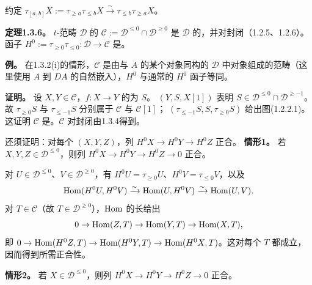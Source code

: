 约定 $\tau_{[a,b]}X:=\tau_{\geq a}\tau_{\leq b}X\xrightarrow{\sim}\tau_{\leq b}\tau_{\geq a}X$。

\par\medskip\noindent\textbf{定理1.3.6。} $t$-范畴 $\mathcal D$ 的 $\mathcal C:=\mathcal D^{\leq0}\cap\mathcal D^{\geq0}$ 是 $\mathcal D$ 的，并对封闭（1.2.5、1.2.6）。函子 $H^0:=\tau_{\geq0}\tau_{\leq0}:\mathcal D\to\mathcal C$ 是。

\par\medskip\noindent\textbf{例。} 在1.3.2(i)的情形，$\mathcal C$ 是由与 $A$ 的某个对象同构的 $\mathcal D$ 中对象组成的范畴（这里使用 $A$ 到 $DA$ 的自然嵌入），$H^0$ 与通常的 $H^0$ 函子等同。

\par\medskip\noindent\textbf{证明。} 设 $X,Y\in\mathcal C$，$f:X\to Y$ 的为 $S$。 $(Y,S,X[1])$ 表明 $S\in\mathcal D^{\leq0}\cap\mathcal D^{\geq-1}$。故 $\tau_{\geq0}S$ 与 $\tau_{\leq-1}S$ 分别属于 $\mathcal C$ 与 $\mathcal C[1]$； $(\tau_{\leq-1}S,S,\tau_{\geq0}S)$ 给出图(1.2.2.1)。这证明 $\mathcal C$ 是。$\mathcal C$ 对封闭由1.3.4得到。

还须证明：对每个 $(X,Y,Z)$，列 $H^0X\to H^0Y\to H^0Z$ 正合。
\noindent\textbf{情形1。} 若 $X,Y,Z\in\mathcal D^{\leq0}$，则列 $H^0X\to H^0Y\to H^0Z\to0$ 正合。

对 $U\in\mathcal D^{\leq0}$、$V\in\mathcal D^{\geq0}$，有 $H^0U=\tau_{\geq0}U$、$H^0V=\tau_{\leq0}V$，以及
\[
 \operatorname{Hom}(H^0U,H^0V)\xrightarrow{\sim}\operatorname{Hom}(U,H^0V)\xrightarrow{\sim}\operatorname{Hom}(U,V).
\]
对 $T\in\mathcal C$（故 $T\in\mathcal D^{\geq0}$），$\operatorname{Hom}$ 的长给出
\[
 0\to\operatorname{Hom}(Z,T)\to\operatorname{Hom}(Y,T)\to\operatorname{Hom}(X,T),
\]
即 $0\to\operatorname{Hom}(H^0Z,T)\to\operatorname{Hom}(H^0Y,T)\to\operatorname{Hom}(H^0X,T)$。这对每个 $T$ 都成立，因而得到所需正合性。

\noindent\textbf{情形2。} 若 $X\in\mathcal D^{\leq0}$，则列 $H^0X\to H^0Y\to H^0Z\to0$ 正合。

